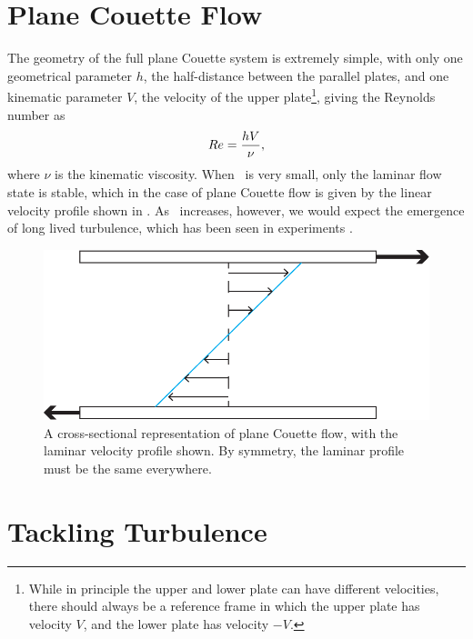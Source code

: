 \section{Plane Couette Flow} 

The geometry of the full plane Couette system is extremely simple, with only one geometrical parameter $h$, the half-distance between the parallel plates, and one kinematic parameter $V$, the velocity of the upper plate\footnote{While in principle the upper and lower plate can have different velocities, there should always be a reference frame in which the upper plate has velocity $V$, and the lower plate has velocity $-V$.}, giving the Reynolds number as 
\begin{equation}
Re = \dfrac{hV}{\nu},
\end{equation}
where $\nu$ is the kinematic viscosity. When \ReN~is very small, only the laminar flow state is stable, which in the case of plane Couette flow is given by the linear velocity profile shown in . As \ReN~increases, however, we would expect the emergence of long lived turbulence, which has been seen in experiments .
\begin{figure}
\centerline{
\includegraphics[scale=0.6]{Figs/planeCouetteMeanFlow}}
\caption{A cross-sectional representation of plane Couette flow, with the laminar velocity profile shown. By symmetry, the laminar profile must be the same everywhere.}\label{fig:planeCouetteBulk}
\end{figure}

\section{Tackling Turbulence} 

